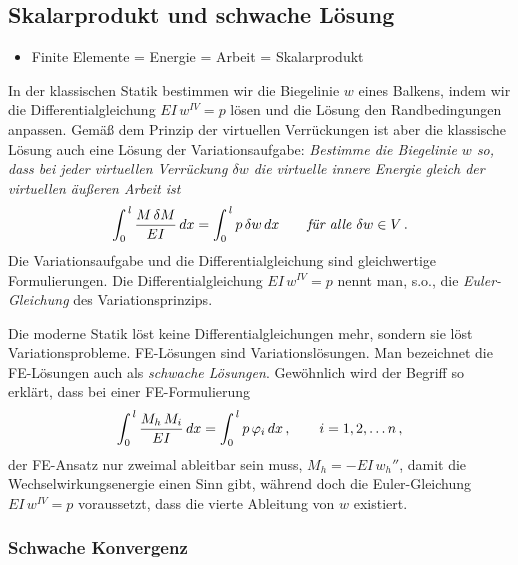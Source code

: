 {\textcolor{sectionTitleBlue}{\section{Skalarprodukt und schwache L\"{o}sung}}}\label{SchwacheLoesung}
\begin{itemize}
\item{Finite Elemente = Energie = Arbeit = Skalarprodukt}
\end{itemize}
In der klassischen Statik bestimmen wir die Biegelinie $w$ eines Balkens, indem wir die Differentialgleichung $EI\,w^{IV} = p$ l\"{o}sen und die L\"{o}sung den Randbedingungen anpassen. Gem\"{a}{\ss} dem Prinzip der virtuellen Verr\"{u}ckungen ist aber die klassische L\"{o}sung auch eine L\"{o}sung der Variationsaufgabe:
{\em Bestimme die Biegelinie $w$ so, dass bei jeder virtuellen Verr\"{u}ckung $\delta w$ die virtuelle innere Energie gleich der virtuellen \"{a}u{\ss}eren Arbeit ist\/}
\begin{align}
\int_0^{\,l} \frac{M\,\delta M}{EI}\,dx = \int_0^{\,l} p\,\delta w\,dx \qquad \mbox{{\em f\"{u}r
alle $\delta w \in V$\/}}\,.
\end{align}
Die Variationsaufgabe und die Differentialgleichung sind gleichwertige Formulierungen. Die Differentialgleichung $EI\,w^{IV} = p$ nennt man, s.o., die {\em Euler-Gleichung\/} des Variationsprinzips.

Die moderne Statik l\"{o}st keine Differentialgleichungen mehr, sondern sie l\"{o}st Variationsprobleme.
FE-L\"{o}sungen sind Variationsl\"{o}sungen. Man bezeichnet die FE-L\"{o}sungen auch als {\em schwache L\"{o}sungen\/}. Gew\"{o}hnlich wird der Begriff so erkl\"{a}rt, dass bei einer FE-For\-mu\-lier\-ung
\begin{align}
\int_0^{\,l} \frac{M_h\,M_i}{EI}\,dx = \int_0^{\,l} p \,\varphi_i\,dx\,, \qquad i =
1,2,\ldots n\,,
\end{align}
der FE-Ansatz nur zweimal ableitbar sein muss, $M_h = -EI\,w_h''$, damit die
Wechselwirkungsenergie einen Sinn gibt, w\"{a}hrend doch die Euler-Gleichung $EI\,w^{IV} = p$ voraussetzt, dass
die vierte Ableitung von $w$ existiert.

{\textcolor{sectionTitleBlue}{\subsubsection*{Schwache Konvergenz}}}

